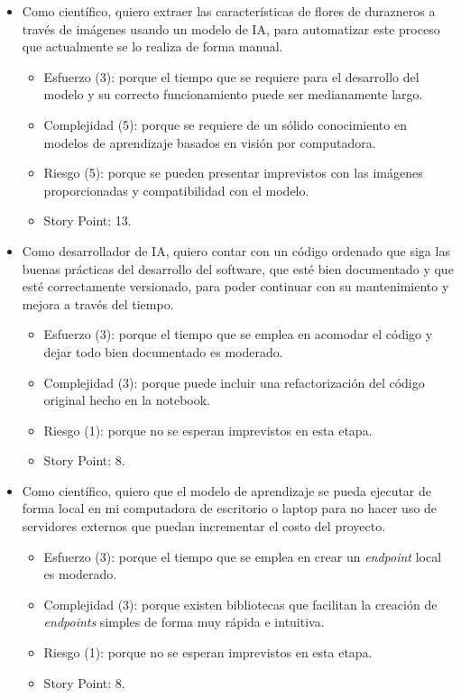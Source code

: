 \documentclass[
11pt, %
]{charter}
\begin{document}
\begin{itemize}
	\item Como científico, quiero extraer las características de flores de durazneros a través de imágenes usando un modelo de IA, para automatizar este proceso que actualmente se lo realiza de forma manual.
	\begin{itemize}
	\item Esfuerzo (3): porque el tiempo que se requiere para el desarrollo del modelo y su correcto funcionamiento puede ser medianamente largo.
	\item Complejidad (5): porque se requiere de un sólido conocimiento en modelos de aprendizaje basados en visión por computadora. 
	\item Riesgo (5): porque se pueden presentar imprevistos con las imágenes proporcionadas y compatibilidad con el modelo.
	\item Story Point: 13.
\end{itemize}
	\item Como desarrollador de IA, quiero contar con un código ordenado que siga las buenas prácticas del desarrollo del software, que esté bien documentado y que esté correctamente versionado, para poder continuar con su mantenimiento y mejora a través del tiempo.
	\begin{itemize}
	\item Esfuerzo (3): porque el tiempo que se emplea en acomodar el código y dejar todo bien documentado es moderado.
	\item Complejidad (3): porque puede incluir una refactorización del código original hecho en la notebook.
	\item Riesgo (1): porque no se esperan imprevistos en esta etapa.
	\item Story Point: 8.
\end{itemize}
	\item Como científico, quiero que el modelo de aprendizaje se pueda ejecutar de forma local en mi computadora de escritorio o laptop para no hacer uso de servidores externos que puedan incrementar el costo del proyecto.
	\begin{itemize}
	\item Esfuerzo (3): porque el tiempo que se emplea en crear un \textit{endpoint} local es moderado.
	\item Complejidad (3): porque existen bibliotecas que facilitan la creación de \textit{endpoints} simples de forma muy rápida e intuitiva.
	\item Riesgo (1): porque no se esperan imprevistos en esta etapa.
	\item Story Point: 8.
\end{itemize}
\end{itemize}
\end{document}
